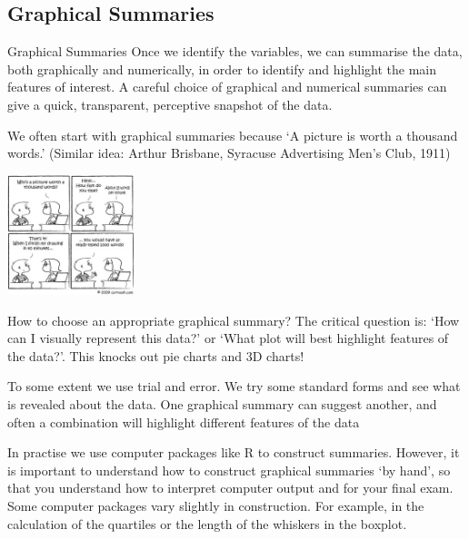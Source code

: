 \documentclass[t,xcolor=pdftex,dvipsnames,table]{beamer}
\begin{document}
\subsection[]{Graphical Summaries}
\begin{frame}{Graphical Summaries}
Once we identify the variables, we can summarise the data, both graphically and numerically, in order to identify and highlight the main features of interest.   A careful choice of graphical and numerical summaries can give a quick, transparent, perceptive snapshot of the data. 

\vspace{.5cm}
We often start with graphical summaries because `A picture is worth a thousand words.' (Similar idea: Arthur Brisbane, Syracuse Advertising Men's Club, 1911)

\begin{center}
\includegraphics[height=3.5cm]{../images/PictureWords.jpg}
\end{center}
\href{www.abpublish.co.uk/blogphotos/picture_thousand_words.jpg}{}
\end{frame}


\begin{frame}{How to choose an appropriate graphical summary?}
The critical question is: `How can I visually represent this data?' or `What plot will best highlight features of the data?'. This knocks out pie charts and 3D charts!

\vspace{.5cm}
To some extent we use trial and error. We try some standard forms and see what is revealed about the data. One graphical summary can suggest another, and often a combination will highlight different features of the data

\vspace{.5cm}
In practise we use computer packages like R to construct summaries.
However, it is important to understand how to construct graphical summaries ‘by hand’, so that you understand how to interpret computer output and for your final exam. Some computer packages vary slightly in construction. For example, in the calculation of the quartiles or the length of the whiskers in the boxplot.
\end{frame}
\end{document}
